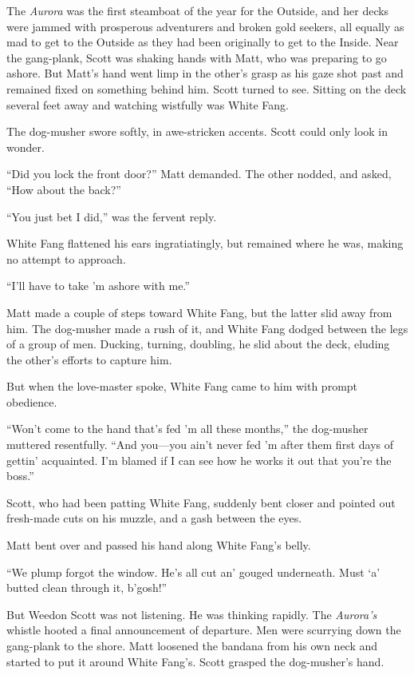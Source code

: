 \documentclass[10pt]{book}
\begin{document}
The \emph{Aurora} was the first steamboat of the year for the Outside, and
her decks were jammed with prosperous adventurers and broken gold
seekers, all equally as mad to get to the Outside as they had been
originally to get to the Inside. Near the gang-plank, Scott was shaking
hands with Matt, who was preparing to go ashore. But Matt’s hand went
limp in the other’s grasp as his gaze shot past and remained fixed on
something behind him. Scott turned to see. Sitting on the deck several
feet away and watching wistfully was White Fang.

The dog-musher swore softly, in awe-stricken accents. Scott could only
look in wonder.

“Did you lock the front door?” Matt demanded. The other nodded, and
asked, “How about the back?”

“You just bet I did,” was the fervent reply.

White Fang flattened his ears ingratiatingly, but remained where he
was, making no attempt to approach.

“I’ll have to take ’m ashore with me.”

Matt made a couple of steps toward White Fang, but the latter slid away
from him. The dog-musher made a rush of it, and White Fang dodged
between the legs of a group of men. Ducking, turning, doubling, he slid
about the deck, eluding the other’s efforts to capture him.

But when the love-master spoke, White Fang came to him with prompt
obedience.

“Won’t come to the hand that’s fed ’m all these months,” the dog-musher
muttered resentfully. “And you—you ain’t never fed ’m after them first
days of gettin’ acquainted. I’m blamed if I can see how he works it out
that you’re the boss.”

Scott, who had been patting White Fang, suddenly bent closer and
pointed out fresh-made cuts on his muzzle, and a gash between the eyes.

Matt bent over and passed his hand along White Fang’s belly.

“We plump forgot the window. He’s all cut an’ gouged underneath. Must
‘a’ butted clean through it, b’gosh!”

But Weedon Scott was not listening. He was thinking rapidly. The
\emph{Aurora’s} whistle hooted a final announcement of departure. Men were
scurrying down the gang-plank to the shore. Matt loosened the bandana
from his own neck and started to put it around White Fang’s. Scott
grasped the dog-musher’s hand.
\end{document}
